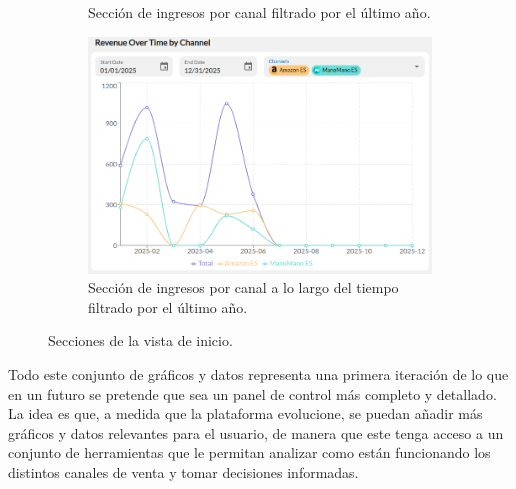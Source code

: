 \begin{figure}[H]
\begin{subfigure}{0.48\linewidth}
        \caption{Sección de ingresos por canal filtrado por el último año.}
    \end{subfigure}
    \hfill
    \begin{subfigure}{0.48\linewidth}
        \centering
        \includegraphics[width=\linewidth]{figures/design_develop/screenshots/dash_sec4.png}
        \caption{Sección de ingresos por canal a lo largo del tiempo filtrado por el último año.}
    \end{subfigure}
    \par\vspace{0.3cm}
    \caption{Secciones de la vista de inicio.}
    \label{fig:dev:ss:vista_inicio_secciones}
\end{figure}

Todo este conjunto de gráficos y datos representa una primera iteración de lo que en un futuro se pretende que sea un panel de control más completo y detallado. La idea es que, a medida que la plataforma evolucione, se puedan añadir más gráficos y datos relevantes para el usuario, de manera que este tenga acceso a un conjunto de herramientas que le permitan analizar como están funcionando los distintos canales de venta y tomar decisiones informadas.